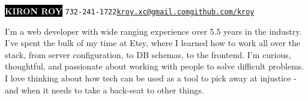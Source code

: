 \documentclass[9pt]{developercv} %
\begin{document}

\begin{minipage}[t]{1\textwidth} %
    \vspace{-\baselineskip} %
    
    \colorbox{black}{{\HUGE\textcolor{white}{\textbf{\MakeUppercase{Kiron Roy}}}}} \hspace{.3 cm} \large\texttt{732-241-1722\slashsep\href{mailto:kroy.xc@gmail.com}{kroy.xc@gmail.com}\slashsep\href{https://github.com/kroy}{github.com/kroy}}
    
    \vspace{6pt}
    
\end{minipage}

\vspace{0.5cm}



\begin{minipage}[t]{0.4\textwidth} %
    \vspace{-\baselineskip} %
    
    I'm a web developer with wide ranging experience over 5.5 years in the industry. I've spent the bulk of my time at Etsy, where I learned how to work all over the stack, from server configuration, to DB schemas, to the frontend. I'm curious, thoughtful, and passionate about working with people to solve difficult problems. I love thinking about how tech can be used as a tool to pick away at injustice - and when it needs to take a back-seat to other things.
\end{minipage}
\hfill %
\begin{minipage}[t]{0.5\textwidth} %
    \vspace{-\baselineskip} %
    \\
    \\
    \\
\end{minipage}
\end{document}

